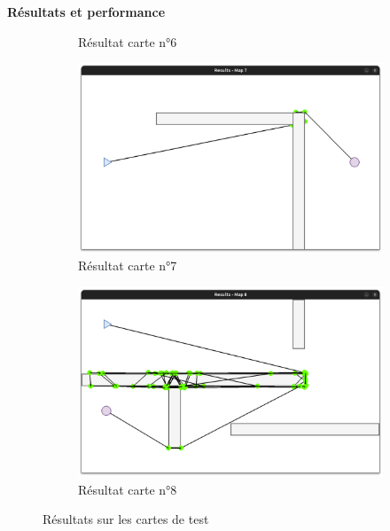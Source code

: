\documentclass[aspectratio=169,10pt]{beamer}
\begin{document}
\begin{frame}{\textbf{Résultats et performance}}
\begin{figure}[H]
\begin{subfigure}[b]{0.24\textwidth}
			\caption*{Résultat carte n°6}
			\label{fig:rmap6}
		\end{subfigure}
		\hfill
		\begin{subfigure}[b]{0.24\textwidth}
			\centering
			\includegraphics[width=\textwidth]{IMAGES/rmap7.png}
			\caption*{Résultat carte n°7}
			\label{fig:rmap7}
		\end{subfigure}
		\hfill
		\begin{subfigure}[b]{0.24\textwidth}
			\centering
			\includegraphics[width=\textwidth]{IMAGES/rmap8.png}
			\caption*{Résultat carte n°8}
			\label{fig:rmap8}
		\end{subfigure}
		\caption{Résultats sur les cartes de test}
		\label{fig:results_benchmark_maps}
	\end{figure}
\end{frame}
\end{document}
